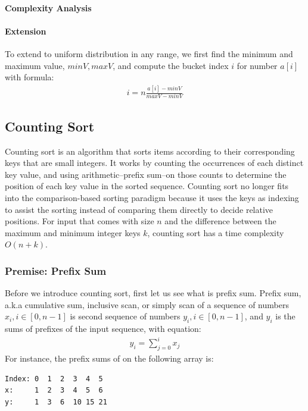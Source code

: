 \documentclass[../main.tex]{subfiles}
\begin{document}
\paragraph{Complexity Analysis} 
\paragraph{Extension} To extend to uniform distribution in any range, we first find the minimum and maximum value, $minV, maxV$, and  compute the bucket index $i$  for number $a[i]$ with formula:
\begin{align}
i= n\frac{a[i]-minV}{maxV-minV} 
\end{align}
\subsection{Counting Sort}
\label{O_n_k_sorting}
Counting sort is an algorithm that sorts items according to their corresponding keys that are small integers. It works by counting the occurrences of each distinct key value, and using arithmetic--prefix sum--on those counts to determine the position of each key value in the sorted sequence.  Counting sort no longer fits into the comparison-based sorting paradigm because it uses the keys as indexing to assist the sorting instead of comparing them directly to decide  relative positions. For input that comes with size $n$ and the difference between the maximum and minimum integer keys $k$, counting sort has a time complexity $O(n+k)$.






\subsubsection{Premise: Prefix Sum} Before we introduce counting sort, first let us see what is prefix sum. Prefix sum, a.k.a cumulative sum, inclusive scan, or simply scan of a sequence of numbers $x_i, i \in [0, n-1]$ is  second sequence of numbers $y_i, i \in [0, n-1]$, and $y_i$ is the sums of prefixes of the input sequence, with equation:
\begin{align}
 y_i = \sum_{j=0}^ix_j   
\end{align}
For instance, the prefix sums of on the following array is: 
\begin{lstlisting}[numbers=none]
Index: 0  1  2  3  4  5
x:     1  2  3  4  5  6
y:     1  3  6  10 15 21
\end{lstlisting}
\end{document}
